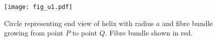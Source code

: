 %

\begin{figure}[!h]
  \centering
  \texttt{[image: fig\_u1.pdf]}
  \caption{Circle representing end view of helix with radius $a$ and fibre bundle growing from point $P$ to point $Q$. Fibre bundle shown in red.}
  \label{fig:unf1}
\end{figure}

%


